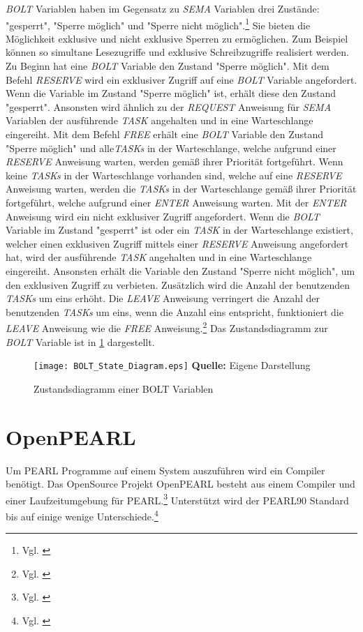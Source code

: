 \emph{BOLT} Variablen haben im Gegensatz zu \emph{SEMA} Variablen drei Zustände:
"gesperrt", "Sperre möglich" und "Sperre nicht möglich".\footnote{Vgl.
\autocite[125]{PEARL}} Sie bieten die Möglichkeit exklusive und nicht exklusive
Sperren zu ermöglichen. Zum Beispiel können so simultane Lesezugriffe und
exklusive Schreibzugriffe realisiert werden. Zu Beginn hat eine \emph{BOLT}
Variable den Zustand "Sperre möglich". Mit dem Befehl \emph{RESERVE} wird ein
exklusiver Zugriff auf eine \emph{BOLT} Variable angefordert. Wenn die Variable
im Zustand "Sperre möglich" ist, erhält diese den Zustand "gesperrt". Ansonsten
wird ähnlich zu der \emph{REQUEST} Anweisung für \emph{SEMA} Variablen der
ausführende \emph{TASK} angehalten und in eine Warteschlange eingereiht. Mit dem
Befehl \emph{FREE} erhält eine \emph{BOLT} Variable den Zustand "Sperre möglich"
und alle\emph{TASKs} in der Warteschlange, welche aufgrund einer \emph{RESERVE}
Anweisung warten, werden gemäß ihrer Priorität fortgeführt. Wenn keine
\emph{TASKs} in der Warteschlange vorhanden sind, welche auf eine \emph{RESERVE}
Anweisung warten, werden die \emph{TASKs} in der Warteschlange gemäß ihrer
Priorität fortgeführt, welche aufgrund einer \emph{ENTER} Anweisung warten. Mit
der \emph{ENTER} Anweisung wird ein nicht exklusiver Zugriff angefordert. Wenn
die \emph{BOLT} Variable im Zustand "gesperrt" ist oder ein \emph{TASK} in der
Warteschlange existiert, welcher einen exklusiven Zugriff mittels einer
\emph{RESERVE} Anweisung angefordert hat, wird der ausführende \emph{TASK}
angehalten und in eine Warteschlange eingereiht. Ansonsten erhält die Variable
den Zustand "Sperre nicht möglich", um den exklusiven Zugriff zu verbieten.
Zusätzlich wird die Anzahl der benutzenden \emph{TASKs} um eins erhöht. Die
\emph{LEAVE} Anweisung verringert die Anzahl der benutzenden \emph{TASKs} um
eins, wenn die Anzahl eins entspricht, funktioniert die \emph{LEAVE} Anweisung
wie die \emph{FREE} Anweisung.\footnote{Vgl. \autocite[125-127]{PEARL}} Das
Zustandsdiagramm zur \emph{BOLT} Variable ist in \cref{fig:BOLT_StateDiagram}
dargestellt.
\begin{figure}[ht]
  \texttt{[image: BOLT\_State\_Diagram.eps]}
  \footnotesize\sffamily\textbf{Quelle:} Eigene Darstellung
  \caption{Zustandsdiagramm einer BOLT Variablen}
  \label{fig:BOLT_StateDiagram}
\end{figure}

\section{OpenPEARL}
\label{section:OpenPEARL}
Um PEARL Programme auf einem System auszuführen wird ein Compiler benötigt. Das
OpenSource Projekt OpenPEARL besteht aus einem Compiler und einer
Laufzeitumgebung für PEARL.\footnote{Vgl. \autocite{OpenPEARL_Structure}}
Unterstützt wird der PEARL90 Standard bis auf einige wenige
Unterschiede.\footnote{Vgl. \autocite{OpenPEARL_Differences_To_PEARL90}}

